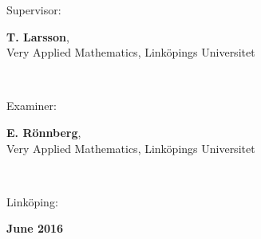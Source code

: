\documentclass[a4paper, 10pt, twoside, openright]{book}
\newcommand{\putthemonth}[0]{June }%
\newcommand{\putshortdate}[0]{2016}
\newcommand{\putmydate}[0]{\putthemonth \putshortdate}
\newcommand{\putexaminer}[0]{E. Rönnberg}
\newcommand{\putsupervisor}[0]{T. Larsson}
\newcommand{\putdepartment}[0]{Very Applied Mathematics}
\newcommand{\putliu}[0]{Linköpings Universitet}
\begin{document}
{\begin{minipage}{150mm}
                Supervisor:\hspace*{3pt}
                \begin{minipage}[t]{120mm}
                  \textbf{\putsupervisor}, \\\putdepartment, \putliu
                \end{minipage} \\ \vspace*{4mm}
                
                Examiner:\hspace*{3pt}
                \begin{minipage}[t]{120mm}
                  \textbf{\putexaminer}, \\\putdepartment, \putliu
                \end{minipage} \\ \vspace*{4mm}
                
                Linköping:
                \begin{minipage}[t]{70mm}
                  \textbf{\putmydate}
                \end{minipage} \\ \vspace*{4mm}
              \end{minipage} \\ \hfill
}

\maketitle

\phantom{crap}
\thispagestyle{empty}
\pagestyle{empty}

\setlength{\unitlength}{1mm}



\setlength{\unitlength}{1pt}
\end{document}
